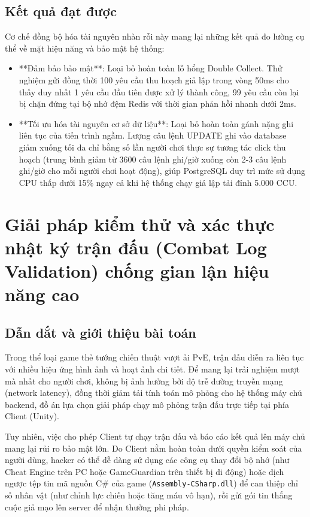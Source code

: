 \documentclass[../Project.tex]{subfiles}
\begin{document}
\subsection{Kết quả đạt được}
Cơ chế đồng bộ hóa tài nguyên nhàn rỗi này mang lại những kết quả đo lường cụ thể về mặt hiệu năng và bảo mật hệ thống:
\begin{itemize}
    \item **Đảm bảo bảo mật**: Loại bỏ hoàn toàn lỗ hổng Double Collect. Thử nghiệm gửi đồng thời 100 yêu cầu thu hoạch giả lập trong vòng 50ms cho thấy duy nhất 1 yêu cầu đầu tiên được xử lý thành công, 99 yêu cầu còn lại bị chặn đứng tại bộ nhớ đệm Redis với thời gian phản hồi nhanh dưới 2ms.
    \item **Tối ưu hóa tài nguyên cơ sở dữ liệu**: Loại bỏ hoàn toàn gánh nặng ghi liên tục của tiến trình ngầm. Lượng câu lệnh UPDATE ghi vào database giảm xuống tối đa chỉ bằng số lần người chơi thực sự tương tác click thu hoạch (trung bình giảm từ 3600 câu lệnh ghi/giờ xuống còn 2-3 câu lệnh ghi/giờ cho mỗi người chơi hoạt động), giúp PostgreSQL duy trì mức sử dụng CPU thấp dưới 15\% ngay cả khi hệ thống chạy giả lập tải đỉnh 5.000 CCU.
\end{itemize}

\section{Giải pháp kiểm thử và xác thực nhật ký trận đấu (Combat Log Validation) chống gian lận hiệu năng cao}
\label{sec:sol_combat_validation}

\subsection{Dẫn dắt và giới thiệu bài toán}
Trong thể loại game thẻ tướng chiến thuật vượt ải PvE, trận đấu diễn ra liên tục với nhiều hiệu ứng hình ảnh và hoạt ảnh chi tiết. Để mang lại trải nghiệm mượt mà nhất cho người chơi, không bị ảnh hưởng bởi độ trễ đường truyền mạng (network latency), đồng thời giảm tải tính toán mô phỏng cho hệ thống máy chủ backend, đồ án lựa chọn giải pháp chạy mô phỏng trận đấu trực tiếp tại phía Client (Unity).

Tuy nhiên, việc cho phép Client tự chạy trận đấu và báo cáo kết quả lên máy chủ mang lại rủi ro bảo mật lớn. Do Client nằm hoàn toàn dưới quyền kiểm soát của người dùng, hacker có thể dễ dàng sử dụng các công cụ thay đổi bộ nhớ (như Cheat Engine trên PC hoặc GameGuardian trên thiết bị di động) hoặc dịch ngược tệp tin mã nguồn C\# của game (\texttt{Assembly-CSharp.dll}) để can thiệp chỉ số nhân vật (như chỉnh lực chiến hoặc tăng máu vô hạn), rồi gửi gói tin thắng cuộc giả mạo lên server để nhận thưởng phi pháp.
\end{document}
